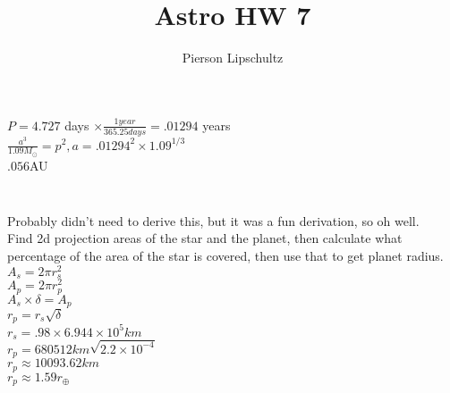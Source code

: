 \documentclass{article}
\title{Astro HW 7}
\author{Pierson Lipschultz}
\begin{document}
\maketitle
\setcounter{section}{7}

\subsection{}


\subsubsection{}

\begin{center} 
    \(P = 4.727\) days \(\times \frac{1 year}{365.25days} = .01294\) years \\
    \(\frac{a^3}{1.09 M_\odot} = p^2, a = .01294^2 \times 1.09 ^{1/3}\) \\
    \(.056\)AU 
\end{center}

\subsubsection{}

\begin{center}
    \\
    Probably didn't need to derive this, but it was a fun derivation, so oh well. \\
    Find 2d projection areas of the star and the planet, then calculate what percentage of the area of the star is covered, then use that to get planet radius.\\
    \(A_s = 2\pi r_s^2\)\\
    \(A_p = 2\pi r_p^2\)\\
    \(A_s \times \delta = A_p\)\\
    \(r_p = r_s \sqrt{\delta}\) \\
    \(r_s = .98 \times 6.944 \times 10^5km\)\\
    \(r_p = 680512km\sqrt{2.2\times10^{-4}}\)\\
    \(r_p \approx 10093.62km\) \\
    \(r_p \approx 1.59 r_\oplus\)
\end{center}
\end{document}
